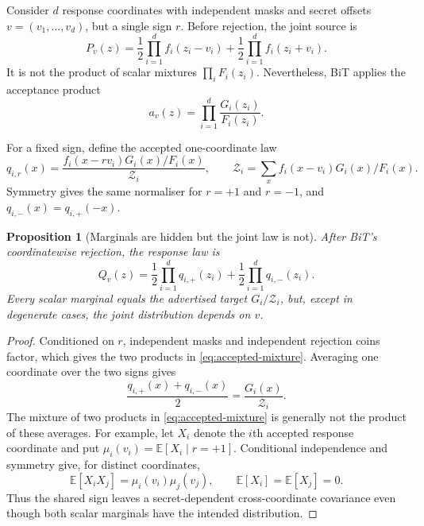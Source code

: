 \documentclass[11pt,a4paper]{article}
\newtheorem{proposition}[theorem]{Proposition}
\newcommand{\E}{\mathbb{E}}
\begin{document}
Consider $d$ response coordinates with independent masks and secret offsets
$v=(v_1,\ldots,v_d)$, but a single sign $r$.  Before rejection, the joint
source is
\begin{equation}
 P_v(z)=\frac12\prod_{i=1}^d f_i(z_i-v_i)
       +\frac12\prod_{i=1}^d f_i(z_i+v_i).
 \label{eq:true-source}
\end{equation}
It is not the product of scalar mixtures
$\prod_i F_i(z_i)$.  Nevertheless, BiT applies the acceptance product
\begin{equation}
                     a_v(z)=\prod_{i=1}^d\frac{G_i(z_i)}{F_i(z_i)}.
 \label{eq:accept-product}
\end{equation}

For a fixed sign, define the accepted one-coordinate law
\begin{equation}
 q_{i,r}(x)=\frac{f_i(x-rv_i)G_i(x)/F_i(x)}{\mathcal Z_i},
 \qquad
 \mathcal Z_i=\sum_x f_i(x-v_i)G_i(x)/F_i(x).
 \label{eq:qir}
\end{equation}
Symmetry gives the same normaliser for $r=+1$ and $r=-1$, and
$q_{i,-}(x)=q_{i,+}(-x)$.

\begin{proposition}[Marginals are hidden but the joint law is not]
After BiT's coordinatewise rejection, the response law is
\begin{equation}
 Q_v(z)=\frac12\prod_{i=1}^d q_{i,+}(z_i)
       +\frac12\prod_{i=1}^d q_{i,-}(z_i).
 \label{eq:accepted-mixture}
\end{equation}
Every scalar marginal equals the advertised target $G_i/\mathcal Z_i$, but, except in
degenerate cases, the joint distribution depends on $v$.
\end{proposition}

\begin{proof}
Conditioned on $r$, independent masks and independent rejection coins factor,
which gives the two products in \eqref{eq:accepted-mixture}.  Averaging one
coordinate over the two signs gives
\[
 \frac{q_{i,+}(x)+q_{i,-}(x)}2
 =\frac{G_i(x)}{\mathcal Z_i}.
\]
The mixture of two products in \eqref{eq:accepted-mixture} is generally not the
product of these averages.  For example, let $X_i$ denote the $i$th accepted
response coordinate and put $\mu_i(v_i)=\E[X_i\mid r=+1]$.
Conditional independence and symmetry give,
for distinct coordinates,
\[
    \E[X_iX_j]=\mu_i(v_i)\mu_j(v_j),
    \qquad \E[X_i]=\E[X_j]=0.
\]
Thus the shared sign leaves a secret-dependent cross-coordinate covariance
even though both scalar marginals have the intended distribution.
\end{proof}
\end{document}
